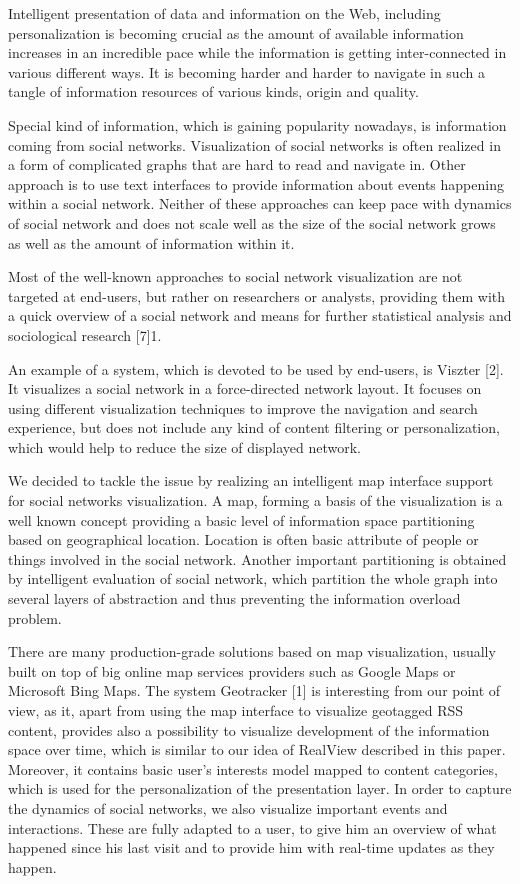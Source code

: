 \documentclass{llncs}
\begin{document}
Intelligent presentation of data and information on the Web, including personalization is becoming crucial as the amount of available information increases in an incredible pace while the information is getting inter-connected in various different ways. It is becoming harder and harder to navigate in such a tangle of information resources of various kinds, origin and quality.

Special kind of information, which is gaining popularity nowadays, is information coming from social networks. Visualization of social networks is often realized in a form of complicated graphs that are hard to read and navigate in. Other approach is to use text interfaces to provide information about events happening within a social network. Neither of these approaches can keep pace with dynamics of social network and does not scale well as the size of the social network grows as well as the amount of information within it.

Most of the well-known approaches to social network visualization are not targeted at end-users, but rather on researchers or analysts, providing them with a quick overview of a social network and means for further statistical analysis and sociological research [7]1.

An example of a system, which is devoted to be used by end-users, is Viszter [2]. It visualizes a social network in a force-directed network layout. It focuses on using different visualization techniques to improve the navigation and search experience, but does not include any kind of content filtering or personalization, which would help to reduce the size of displayed network.

We decided to tackle the issue by realizing an intelligent map interface support for social networks visualization. A map, forming a basis of the visualization is a well known concept providing a basic level of information space partitioning based on geographical location. Location is often basic attribute of people or things involved in the social network. Another important partitioning is obtained by intelligent evaluation of social network, which partition the whole graph into several layers of abstraction and thus preventing the information overload problem.

There are many production-grade solutions based on map visualization, usually built on top of big online map services providers such as Google Maps or Microsoft Bing Maps. The system Geotracker [1] is interesting from our point of view, as it, apart from using the map interface to visualize geotagged RSS content, provides also a possibility to visualize development of the information space over time, which is similar to our idea of RealView described in this paper. Moreover, it contains basic user’s interests model mapped to content categories, which is used for the personalization of the presentation layer.
In order to capture the dynamics of social networks, we also visualize important events and interactions. These are fully adapted to a user, to give him an overview of what happened since his last visit and to provide him with real-time updates as they happen.
\end{document}
